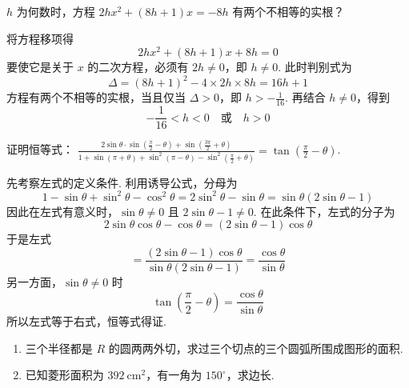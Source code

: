 \begin{problem}
\(h\) 为何数时，方程 \(2hx^2+\left(8h+1\right)x=-8h\) 有两个不相等的实根？
\end{problem}

\begin{solution}
将方程移项得
\[
2hx^2+\left(8h+1\right)x+8h=0
\]
要使它是关于 \(x\) 的二次方程，必须有 \(2h\neq 0\)，即 \(h\neq 0\). 此时判别式为
\[
\Delta=\left(8h+1\right)^2-4\times 2h\times 8h=16h+1
\]
方程有两个不相等的实根，当且仅当 \(\Delta>0\)，即 \(h>-\frac{1}{16}\). 再结合 \(h\neq 0\)，得到
\[
-\frac{1}{16}<h<0\quad\text{或}\quad h>0
\]
\end{solution}

\begin{problem}
证明恒等式：
\(\frac{2\sin\theta\cdot\sin\left(\frac{\pi}{2}-\theta\right)+\sin\left(\frac{3\pi}{2}+\theta\right)}{1+\sin\left(\pi+\theta\right)+\sin^2\left(\pi-\theta\right)-\sin^2\left(\frac{\pi}{2}+\theta\right)}=\tan\left(\frac{\pi}{2}-\theta\right)\).
\end{problem}

\begin{solution}
先考察左式的定义条件. 利用诱导公式，分母为
\[
1-\sin\theta+\sin^2\theta-\cos^2\theta
=2\sin^2\theta-\sin\theta
=\sin\theta\left(2\sin\theta-1\right)
\]
因此在左式有意义时，\(\sin\theta\neq 0\) 且 \(2\sin\theta-1\neq 0\). 在此条件下，左式的分子为
\[
2\sin\theta\cos\theta-\cos\theta
=\left(2\sin\theta-1\right)\cos\theta
\]
于是左式
\[
=\frac{\left(2\sin\theta-1\right)\cos\theta}{\sin\theta\left(2\sin\theta-1\right)}
=\frac{\cos\theta}{\sin\theta}
\]
另一方面，\(\sin\theta\neq 0\) 时
\[
\tan\left(\frac{\pi}{2}-\theta\right)=\frac{\cos\theta}{\sin\theta}
\]
所以左式等于右式，恒等式得证.
\end{solution}

\begin{problem}
\begin{enumerate}
\item 三个半径都是 \(R\) 的圆两两外切，求过三个切点的三个圆弧所围成图形的面积.
\item 已知菱形面积为 \(392\mathrm{~cm}^2\)，有一角为 \(150^\circ\)，求边长.
\end{enumerate}
\end{problem}

